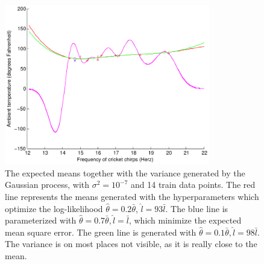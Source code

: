 \documentclass[a4paper,11pt]{article}
\begin{document}
\begin{figure}
  \begin{center}
    \caption{The expected means together with the variance generated by the Gaussian process, with $\sigma^2=10^{-7}$ and 14 train data points.  The red line represents the means generated with the hyperparameters which optimize the log-likelihood $\hat\theta = 0.2\bar\theta$, $\hat l = 93\bar l$.  The blue line is parameterized with $\hat\theta=0.7\bar\theta, \hat l = \bar l$, which minimize the expected mean square error.  The green line is generated with $\hat\theta=0.1\bar\theta, \hat l = 98\bar l$.  The variance is on most places not visible, as it is really close to the mean.}
    \label{fig:ex2plot3}
    \includegraphics[width=0.8\textwidth]{ex2plot3}
  \end{center}
\end{figure}
\end{document}
